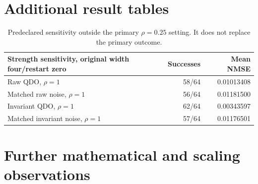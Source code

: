\documentclass[11pt,letterpaper]{article}
\theoremstyle{remark}\newtheorem{remark}{Remark}
\begin{document}
\section{Additional result tables}\label{app:tables}
\begin{table}[H]
\centering\small\setlength{\tabcolsep}{4pt}
\caption{Fixed-dataset ordinary source checkpoints, width four. All continuations themselves use fresh Gaussian examples.}\label{tab:fixedplain}
\end{table}
\begin{table}[H]
\centering\small\setlength{\tabcolsep}{4pt}
\caption{Fixed-dataset directional-guidance source checkpoints, width four. These share nominal teachers with the other cohorts.}\label{tab:fixeddirection}
\end{table}
\begin{table}[H]
\centering\small\setlength{\tabcolsep}{5pt}
\caption{Original source cohorts, restart zero. All six primary Adam arms are shown. Larger widths are predominantly ceiling/regression checks.}\label{tab:widths}
\end{table}
\begin{table}[H]
\centering\small\setlength{\tabcolsep}{6pt}
\caption{Literal identity-metric SGD, restart zero. Raw QDO improves no success count. Each force is calibrated relative to its own base optimizer, so absolute force scales differ from the Adam experiment.}\label{tab:sgd}
\end{table}
\begin{table}[H]
\centering\small
\begin{tabular}{lrr}
\toprule
Strength sensitivity, original width four/restart zero & Successes & Mean NMSE\\
\midrule
Raw QDO, $\rho=1$ & 58/64 & 0.01013408\\
Matched raw noise, $\rho=1$ & 56/64 & 0.01181500\\
Invariant QDO, $\rho=1$ & 62/64 & 0.00343597\\
Matched invariant noise, $\rho=1$ & 57/64 & 0.01176501\\
\bottomrule
\end{tabular}
\caption{Predeclared sensitivity outside the primary $\rho=0.25$ setting. It does not replace the primary outcome.}\label{tab:strength}
\end{table}

\section{Further mathematical and scaling observations}\label{app:scaling}
\end{document}
